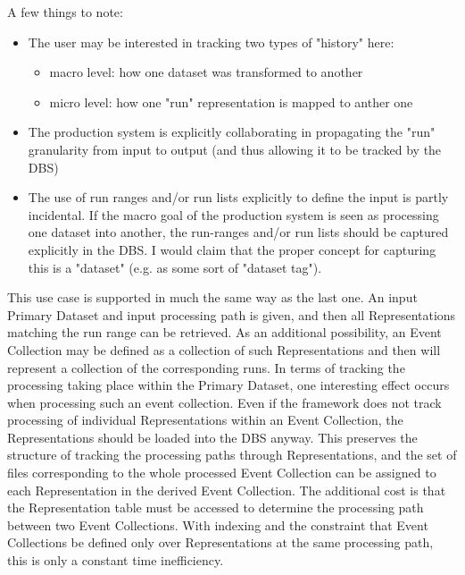 \documentclass{cmspaper}
\begin{document}
  A few things to note:
\begin{itemize}

\item The user may be interested in tracking two types of "history" here:
\begin{itemize}

      \item macro level: how one dataset was transformed to another
      \item micro level: how one "run" representation is mapped to anther one
\end{itemize}

\item The production system is explicitly collaborating in propagating the
    "run" granularity from input to output (and thus allowing it to be
    tracked by the DBS)

\item The use of run ranges and/or run lists explicitly to define the input is 
    partly incidental. If the macro goal of the production system is seen as
    processing one dataset into another, the run-ranges and/or run lists 
    should be captured explicitly in the DBS. I would claim that the proper 
    concept for capturing this is a "dataset" (e.g. as some sort of "dataset 
    tag"). 

\end{itemize}

This use case is supported in much the same way as the last one.  An input 
Primary Dataset and input processing path is given, and then all Representations
matching the run range can be retrieved.  As an additional possibility, an 
Event Collection may be defined as a collection of such Representations and then will 
represent a collection of the corresponding runs.  In terms of tracking the processing
taking place within the Primary Dataset, one interesting effect occurs when 
processing such an event collection.  Even if the framework does not track processing
of individual Representations within an Event Collection, the Representations 
should be loaded into the DBS anyway.  This preserves the structure of tracking 
the processing paths through Representations, and the set of 
files corresponding to the whole processed Event Collection can be assigned to 
each Representation in the derived Event Collection.  The additional cost is that 
the Representation table must be accessed to determine the processing path between 
two Event Collections.  With indexing and the constraint that Event Collections be 
defined only over Representations at the same processing path, this is only a 
constant time inefficiency.
\end{document}
